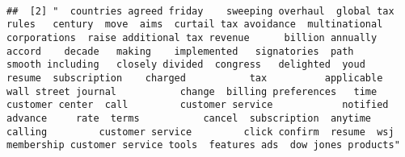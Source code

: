 \documentclass[
]{article}
\begin{document}
\begin{verbatim}
                                                                                                                                                                                                                                                                                                                                                                                                                                                                                                                                   
##  [2] "  countries agreed friday    sweeping overhaul  global tax rules   century  move  aims  curtail tax avoidance  multinational corporations  raise additional tax revenue      billion annually   accord    decade   making    implemented   signatories  path        smooth including   closely divided  congress   delighted  youd   resume  subscription    charged           tax          applicable   wall street journal           change  billing preferences   time   customer center  call         customer service            notified  advance     rate  terms           cancel  subscription  anytime  calling         customer service         click confirm  resume  wsj membership customer service tools  features ads  dow jones products"                                                                                                                                                                                                                                                                                                                                                                                                                                                                                                                                                                                                                                                                                                                                                                                                                                                                                                                                                                                                                                                                                                                                                                                                                                                                                                                                                                                                                                                                                                                                                                                                                                                                                                                                                                                                                                                                                                                                                                                                                                                                                                                                                 
\end{verbatim}
\end{document}
